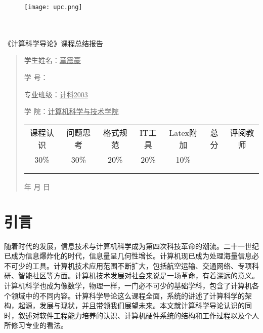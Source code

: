 \documentclass{article}
\renewcommand{\today}{\number\year 年 \number\month 月 \number\day 日}
\begin{document}
\begin{figure}
    \centering
    \texttt{[image: upc.png]}

    \label{figupc}
\end{figure}

	\begin{center}
		\quad \\
		\quad \\
		\heiti \fontsize{45}{17} \quad \quad \quad 
		\vskip 1.5cm
		\heiti {} 《计算科学导论》课程总结报告
	\end{center}
	\vskip 2.0cm
		
	\begin{quotation}
		\doublespacing
		
        \par\setlength\parindent{7em}
		\quad 

		学生姓名：\underline{\qquad  章震豪 \qquad \qquad}

		学\hspace{0.61cm} 号：\underline{\qquad \quad} 
		
		专业班级：\underline{\qquad 计科2003 \qquad  \quad}
		
        学\hspace{0.61cm} 院：\underline{计算机科学与技术学院}
		\vskip 2cm
		\centering
		\begin{table}[h]
            \centering 
            \begin{tabular}{|c|c|c|c|c|c|c|}
                \hline
                课程认识 & 问题思 考 & 格式规范  & IT工具  & Latex附加  & 总分 & 评阅教师 \\
                30\% & 30\% & 20\% & 20\% & 10\% &  &  \\
                \hline
                 & & & & & &\\
                & & & & & &\\
                \hline
            \end{tabular}
        \end{table}
		\vskip 2cm
		\today
	\end{quotation}

\thispagestyle{empty}
\newpage
\setcounter{page}{1}
\section{引言}
随着时代的发展，信息技术与计算机科学成为第四次科技革命的潮流。二十一世纪已成为信息爆炸化的时代，信息量呈几何性增长。计算机现已成为处理海量信息必不可少的工具。计算机技术应用范围不断扩大，包括航空运输、交通网络、专项科研、智能社区等方面。计算机技术发展对社会来说是一场革命，有着深远的意义。计算机科学也成为像数学，物理一样，一门必不可少的基础学科，包含了计算机各个领域中的不同内容。计算科学导论这么课程全面，系统的讲述了计算科学的架构，起源，发展与现状，并且带领我们展望未来。本文就计算科学导论认识的同时，叙述对软件工程能力培养的认识、计算机硬件系统的结构和工作过程以及个人所修习专业的看法。
\end{document}

